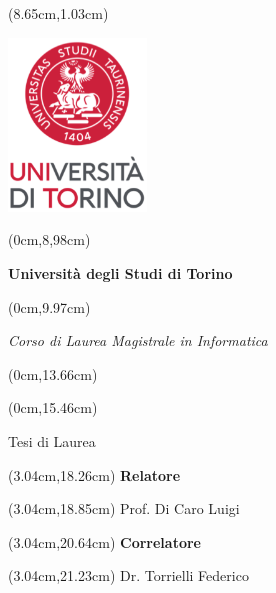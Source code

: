 \frontmatter

\thispagestyle{empty}

\begingroup


\begin{textblock*}{4cm}(8.65cm,1.03cm)
	\centerline {\includegraphics[width=3.67cm]{src/res/unito_logo.png}}
\end{textblock*}


\begin{textblock*}{21cm}(0cm,8,98cm)
	\fontsize{18}{22}\selectfont
	\centerline {\textbf{ Universit\`a degli Studi di Torino}}
\end{textblock*}
\begin{textblock*}{21cm}(0cm,9.97cm)
	\fontsize{18}{22}\selectfont
	\centerline {\textit{Corso di Laurea Magistrale in Informatica}}
\end{textblock*}


\begin{textblock*}{21cm}(0cm,13.66cm)
	\fontsize{20}{24}\selectfont
  \centerline  {\textbf{}}
\end{textblock*}
\begin{textblock*}{21cm}(0cm,15.46cm)
	\fontsize{18}{22}\selectfont
	\centerline{\Large {Tesi di Laurea}}
\end{textblock*}



\fontsize{14}{17}\selectfont

\begin{textblock*}{8cm}(3.04cm,18.26cm)
	\noindent
	\textbf{Relatore}
\end{textblock*}
\begin{textblock*}{8cm}(3.04cm,18.85cm)
	\noindent
	Prof. Di Caro Luigi
\end{textblock*}

\begin{textblock*}{8cm}(3.04cm,20.64cm)
	\noindent
	\textbf{Correlatore}
\end{textblock*}
\begin{textblock*}{8cm}(3.04cm,21.23cm)
	\noindent
	Dr. Torrielli Federico
\end{textblock*}

